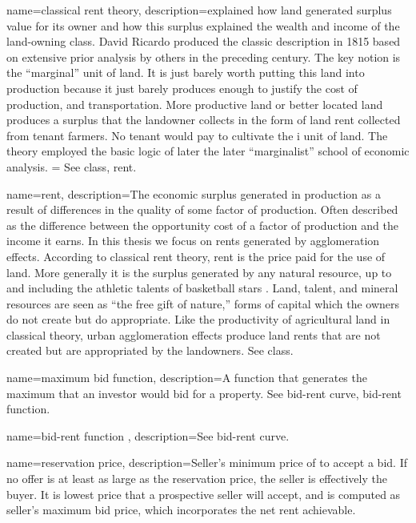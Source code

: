 {
name=classical rent theory,
description={explained how land generated surplus value for its owner and how this surplus explained the wealth and income of the land-owning class. David Ricardo produced the classic description in 1815 based on extensive prior analysis by others in the preceding century. The key notion is the ``marginal'' unit of land. It is just barely worth putting this land into production because it just barely produces enough to justify the cost of production, and transportation. More productive land or better located land produces a surplus that the landowner  collects in the form of land rent collected from tenant farmers. No tenant would pay to cultivate the  i unit of land. The theory employed the basic logic of later the later ``marginalist''  school of economic analysis. = See \gls{class}, \gls{rent}.}
}

{
name=rent,
description={The economic  surplus generated in production as a result of differences in the quality of some \gls{factor of production}. Often described as the difference between the opportunity cost of a factor of production and the income it earns. In this thesis we focus on rents generated by \glspl{agglomeration effect}. According to \gls{classical rent theory}, rent is the price paid for the use of land. More generally it is the  surplus generated by any natural resource, up to and including the athletic talents of basketball stars \cite{lackmanClassicalBaseModern1976}. Land, talent, and mineral resources are seen as ``the free gift of nature,'' forms of capital which the owners do not create but do appropriate. Like the productivity of agricultural land in classical theory,  urban \gls{agglomeration effect}s produce land rents that are not created but are appropriated by the landowners. See \gls{class}.}
}

{
name=maximum bid function,
description={A function that generates the maximum that an investor would bid for a property.  See \gls{bid-rent curve}, \gls{bid-rent function}.}
}

{
name=bid-rent function ,
description={See \gls{bid-rent curve}.}
}

{
name=reservation price,
description={Seller's minimum price of to accept a bid. If no offer is at least as large as the reservation price, the seller is effectively the buyer. It is lowest price that a prospective seller will accept, and is computed as seller's maximum bid price, which incorporates the net rent achievable.}
}

